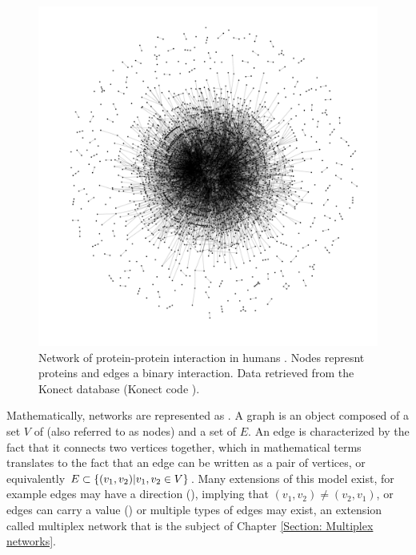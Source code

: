 \documentclass[
11pt, %
english, %
singlespacing, %
nolistspacing, %
liststotoc, %
headsepline, %
]{MastersDoctoralThesis} %
\begin{document}
\begin{figure}
	\includegraphics[width=\textwidth]{network-maayan-vidal.pdf}
	\caption{Network of protein-protein interaction in humans \cite{rual2005towards}. Nodes represnt proteins and edges a binary interaction. Data retrieved from the Konect database \cite{kunegis2013konect} (Konect code ).}
	\label{Figure: Network of human proteins}
\end{figure}

Mathematically, networks are represented as . A graph is an object composed of a set $V$ of  (also referred to as nodes) and a set of  $E$. An edge is characterized by the fact that it connects two vertices together, which in mathematical terms translates to the fact that an edge can be written as a pair of vertices, or equivalently $E \subset \{(v_1, v_2) | v_1, v_2 \in V \}$. Many extensions of this model exist, for example edges may have a direction (), implying that $(v_1, v_2) \neq (v_2, v_1)$, or edges can carry a value () or multiple types of edges may exist, an extension called multiplex network that is the subject of Chapter \ref{Section: Multiplex networks}.
\end{document}
